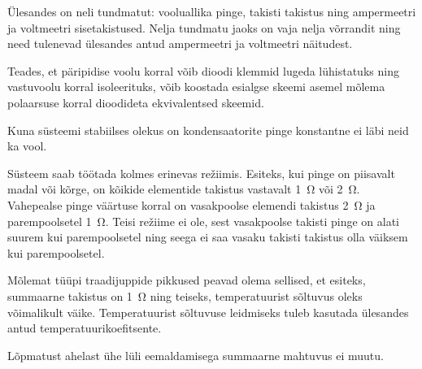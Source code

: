 \documentclass[10pt, twoside]{article}
\begin{document}
{
\hint
Ülesandes on neli tundmatut: vooluallika pinge, takisti takistus ning ampermeetri ja voltmeetri sisetakistused. Nelja tundmatu jaoks on vaja nelja võrrandit ning need tulenevad ülesandes antud ampermeetri ja voltmeetri näitudest.
\probend
\bigskip


\hint
Teades, et päripidise voolu korral võib dioodi klemmid lugeda lühistatuks ning vastuvoolu korral isoleerituks, võib koostada esialgse skeemi asemel mõlema polaarsuse korral dioodideta ekvivalentsed skeemid.
\probend
\bigskip


\hint
Kuna süsteemi stabiilses olekus on kondensaatorite pinge konstantne ei läbi neid ka vool.
\probend
\bigskip


\hint
Süsteem saab töötada kolmes erinevas režiimis. Esiteks, kui pinge on piisavalt madal või kõrge, on kõikide elementide takistus vastavalt \SI{1}{\ohm} või \SI{2}{\ohm}. Vahepealse pinge väärtuse korral on vasakpoolse elemendi takistus \SI{2}{\ohm} ja parempoolsetel \SI{1}{\ohm}. Teisi režiime ei ole, sest vasakpoolse takisti pinge on alati suurem kui parempoolsetel ning seega ei saa vasaku takisti takistus olla väiksem kui parempoolsetel.
\probend
\bigskip


\hint
Mõlemat tüüpi traadijuppide pikkused peavad olema sellised, et esiteks, summaarne takistus on \SI{1}{\ohm} ning teiseks, temperatuurist sõltuvus oleks võimalikult väike. Temperatuurist sõltuvuse leidmiseks tuleb kasutada ülesandes antud temperatuurikoefitsente.
\probend
\bigskip


\hint
Lõpmatust ahelast ühe lüli eemaldamisega summaarne mahtuvus ei muutu.
\probend
\bigskip

}
\end{document}
